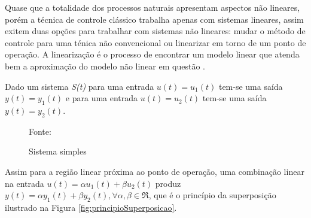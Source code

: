 Quase que a totalidade dos processos naturais apresentam 
aspectos não lineares, porém a técnica de controle clássico trabalha 
apenas com sistemas lineares, assim exitem duas opções para trabalhar 
com sistemas não lineares: 
mudar o método de controle para uma ténica não convencional ou 
linearizar em torno de um ponto de operação. 
A linearização é o processo de encontrar um modelo linear que 
atenda bem a aproximação do modelo não linear em questão \cite{Ogata}.


Dado um sistema \emph{S(t)} para uma entrada $u(t) = u_1(t)$ tem-se uma saída $y(t) = y_1(t)$ e para uma entrada $u(t) = u_2(t)$ tem-se uma saída $y(t) = y_2(t)$.

\begin{figure}[!htb]
\centering
\caption{ Sistema simples}
\label{fig:sistemaSimples}

{\small Fonte: \cite{Ogata}}
\end{figure}

Assim para a região linear próxima ao ponto de operação, uma combinação linear na entrada $u(t) = \alpha u_1(t) + \beta u_2(t)$ produz $y(t) = \alpha y_1(t) + \beta y_2(t), \forall \alpha ,  \beta \in \Re $, que é o princípio da superposição ilustrado na Figura \ref{fig:principioSuperposicao}.



